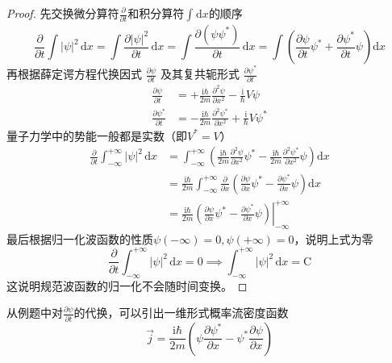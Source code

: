\begin{proof}
    先交换微分算符$\frac{\partial }{\partial t}$和积分算符$\int_{}^{}\mathrm{d}x$的顺序
    $$
        \frac{\partial }{\partial t}\int|\psi|^2 \,\mathrm{d}x
        =\int\frac{\partial |\psi|^2}{\partial t} \,\mathrm{d}x
        =\int\frac{\partial (\psi\psi^*)}{\partial t} \,\mathrm{d}x
        =\int\left(\frac{\partial \psi}{\partial t}\psi^*+\frac{\partial \psi^*}{\partial t}\psi\right)\mathrm{d}x
    $$
    再根据薛定谔方程代换因式 $\frac{\partial \psi}{\partial t}$ 及其复共轭形式 $\frac{\partial \psi^*}{\partial t}$
    $$
        \begin{aligned}
            \frac{\partial \psi}{\partial t}   & = +\frac{\mathrm{i}\hbar}{2m}\frac{\partial^2\psi}{\partial x^2}-\frac{\mathrm{i}}{\hbar}V\psi      \\
            \frac{\partial \psi^*}{\partial t} & = -\frac{\mathrm{i}\hbar}{2m}\frac{\partial^2\psi^*}{\partial x^2}+\frac{\mathrm{i}}{\hbar}V\psi^*
        \end{aligned}
    $$
    量子力学中的势能一般都是实数（即$V^*=V$）
    $$
        \begin{aligned}
            \frac{\partial }{\partial t}\int_{-\infty}^{+\infty}|\psi|^2 \,\mathrm{d}x
             & =\int_{-\infty}^{+\infty}\left(\frac{\mathrm{i}\hbar}{2m}\frac{\partial^2 \psi}{\partial x^2}\psi^*-\frac{\mathrm{i}\hbar}{2m}\frac{\partial^2 \psi^*}{\partial x^2}\psi\right)\mathrm{d}x \\
             & =\frac{\mathrm{i}\hbar}{2m}\int_{-\infty}^{+\infty}\frac{\partial}{\partial x}\left(\frac{\partial \psi}{\partial x}\psi^*-\frac{\partial \psi^*}{\partial x}\psi\right)\mathrm{d}x        \\
             & =\frac{\mathrm{i}\hbar}{2m}\left.\left(\frac{\partial \psi}{\partial x}\psi^*-\frac{\partial \psi^*}{\partial x}\psi\right)\right|_{-\infty}^{+\infty}
        \end{aligned}
    $$
    最后根据归一化波函数的性质$\psi(-\infty)=0,\psi(+\infty)=0$，说明上式为零
    $$
        \frac{\partial }{\partial t}\int_{-\infty}^{+\infty}|\psi|^2 \,\mathrm{d}x=0
        \implies
        \int_{-\infty}^{+\infty}|\psi|^2 \,\mathrm{d}x = \mathrm{C}
    $$
    这说明规范波函数的归一化不会随时间变换。
\end{proof}
从例题中对$\frac{\partial \psi}{\partial t}$的代换，可以引出一维形式概率流密度函数
$$
    \vec{j}=\frac{\mathrm{i}\hbar}{2m}\left(\psi\frac{\partial \psi^*}{\partial x}-\psi^*\frac{\partial \psi}{\partial x}\right)
$$


